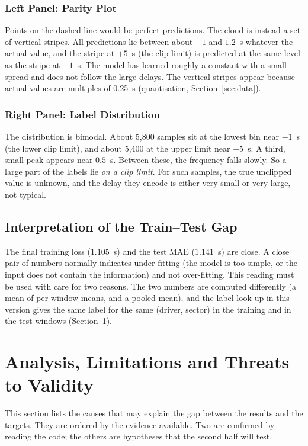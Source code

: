 \documentclass[11pt,a4paper]{article}
\begin{document}
\subsubsection{Left Panel: Parity Plot}
Points on the dashed line would be perfect predictions. The cloud is instead a
set of vertical stripes. All predictions lie between about $-1$ and $1.2$~s
whatever the actual value, and the stripe at $+5$~s (the clip limit) is
predicted at the same level as the stripe at $-1$~s. The model has learned
roughly a constant with a small spread and does not follow the large
delays. The vertical stripes appear because actual values are multiples of
0.25~s (quantisation, Section~\ref{sec:data}).

\subsubsection{Right Panel: Label Distribution}
The distribution is bimodal. About 5{,}800 samples sit at the lowest bin near
$-1$~s (the lower clip limit), and about 5{,}400 at the upper limit near
$+5$~s. A third, small peak appears near $0.5$~s. Between these, the
frequency falls slowly. So a large part of the labels lie \emph{on a clip
limit}. For such samples, the true unclipped value is unknown, and the
delay they encode is either very small or very large, not typical.

\subsection{Interpretation of the Train--Test Gap}
The final training loss ($1.105$~s) and the test MAE ($1.141$~s) are close. A
close pair of numbers normally indicates under-fitting (the model is too
simple, or the input does not contain the information) and not over-fitting.
This reading must be used with care for two reasons. The two numbers are
computed differently (a mean of per-window means, and a pooled mean), and the
label look-up in this version gives the same label for the same (driver,
sector) in the training and in the test windows (Section~\ref{sec:analysis}).

\section{Analysis, Limitations and Threats to Validity}
\label{sec:analysis}
This section lists the causes that may explain the gap between the results and
the targets. They are ordered by the evidence available. Two are confirmed by
reading the code; the others are hypotheses that the second half will test.
\end{document}
